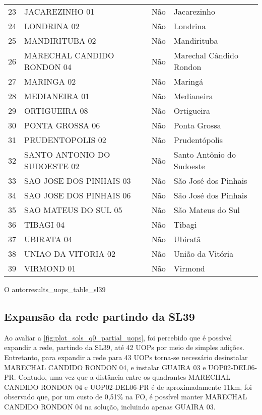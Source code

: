 {\begin{tabular}{l|l|l|l}
23 &               JACAREZINHO 01 &   Não &               Jacarezinho \\
24 &                  LONDRINA 02 &   Não &                  Londrina \\
25 &               MANDIRITUBA 02 &   Não &               Mandirituba \\
26 &   MARECHAL CANDIDO RONDON 04 &   Não &   Marechal Cândido Rondon \\
27 &                   MARINGA 02 &   Não &                   Maringá \\
28 &                MEDIANEIRA 01 &   Não &                Medianeira \\
29 &                ORTIGUEIRA 08 &   Não &                Ortigueira \\
30 &              PONTA GROSSA 06 &   Não &              Ponta Grossa \\
31 &             PRUDENTOPOLIS 02 &   Não &             Prudentópolis \\
32 & SANTO ANTONIO DO SUDOESTE 02 &   Não & Santo Antônio do Sudoeste \\
33 &      SAO JOSE DOS PINHAIS 03 &   Não &      São José dos Pinhais \\
34 &      SAO JOSE DOS PINHAIS 06 &   Não &      São José dos Pinhais \\
35 &         SAO MATEUS DO SUL 05 &   Não &         São Mateus do Sul \\
36 &                    TIBAGI 04 &   Não &                    Tibagi \\
37 &                   UBIRATA 04 &   Não &                   Ubiratã \\
38 &          UNIAO DA VITORIA 02 &   Não &          União da Vitória \\
39 &                   VIRMOND 01 &   Não &                   Virmond \\
 \hline
\end{tabular}}
{O autor}{results_uops_table_sl39}{}{}


\subsection{Expansão da rede partindo da SL39} \label{ssec:expansao_sl39}

Ao avaliar a \autoref{fig:plot_sols_q0_partial_uops}, foi percebido que é possível expandir a rede, partindo da SL39, até 42 UOPs por meio de simples adições. Entretanto, para expandir a rede para 43 UOPs torna-se necessário desinstalar MARECHAL CANDIDO RONDON 04, e instalar GUAIRA 03 e UOP02-DEL06-PR. Contudo, uma vez que a distância entre os quadrantes MARECHAL CANDIDO RONDON 04 e UOP02-DEL06-PR é de aproximadamente 11km, foi observado que, por um custo de 0,51\% na FO, é possível manter MARECHAL CANDIDO RONDON 04 na solução, incluindo apenas GUAIRA 03. 

